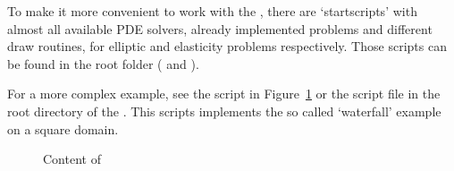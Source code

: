 \bigskip
\noindent To make it more convenient to work with the \FFW, there are `startscripts' with almost all available PDE solvers, already implemented problems and different draw routines, for elliptic and elasticity problems respectively. Those scripts can be found in the root folder ( and ).\bigskip

\noindent For a more complex example, see the script in Figure~\ref{sect:Quickstart.fig.code:advancedExample} or the script file  in the root directory of the \FFW\!. This scripts implements the so called `waterfall' example on a square domain.

\begin{figure}[ht!]
\caption{Content of }\label{sect:Quickstart.fig.code:advancedExample}
\end{figure}
\clearpage